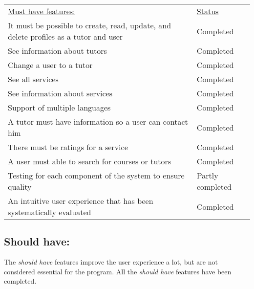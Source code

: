 \begin{table}[h]
    \begin{tabularx}{\textwidth}{|X|l|}
    \underline{Must have features:}                                                                   & \underline{Status} \\
    It must be possible to create, read, update, and delete profiles as a tutor and user              & Completed \\
    See information about tutors                                                                      & Completed \\
    Change a user to a tutor                                                                          & Completed \\
    See all services                                                                                  & Completed \\
    See information about services                                                                    & Completed \\
    Support of multiple languages                                                                     & Completed \\
    A tutor must have information so a user can contact him                                           & Completed \\
    There must be ratings for a service                                                                 & Completed \\
    A user must able to search for courses or tutors                                                  & Completed \\
    Testing for each component of the system to ensure quality                                        & Partly completed \\
    An intuitive user experience that has been systematically evaluated                               & Completed \\
    \end{tabularx}
\end{table}

\subsection{Should have:}
The \textit{should have} features improve the user experience a lot, but are not considered essential for the program.
All the \textit{should have} features have been completed.

